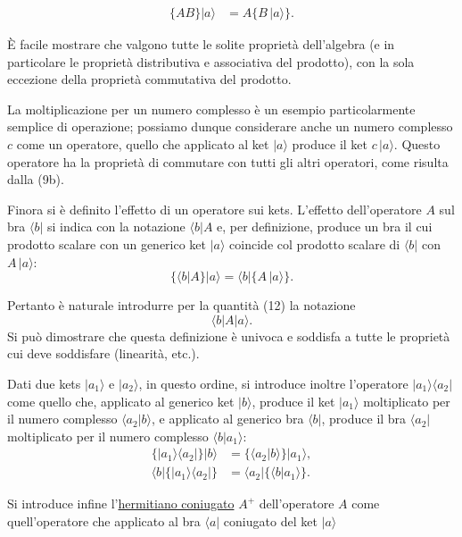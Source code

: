 \documentclass[11pt, a4paper]{book}
\numberwithin{equation}{section}
\begin{document}

\begin{align}
\bigl\{AB\bigr\}|a\rangle &= A\bigl\{B\,|a\rangle\bigr\}. \tag{11}
\end{align}

È facile mostrare che valgono tutte le solite proprietà dell'algebra (e
in particolare le proprietà distributiva e associativa del prodotto), con
la sola eccezione della proprietà commutativa del prodotto.

La moltiplicazione per un numero complesso è un esempio particolarmente
semplice di operazione; possiamo dunque considerare anche un numero
complesso $c$ come un operatore, quello che applicato al ket $|a\rangle$
produce il ket $c\,|a\rangle$. Questo operatore ha la proprietà di
commutare con tutti gli altri operatori, come risulta dalla (9b).

Finora si è definito l'effetto di un operatore sui kets. L'effetto
dell'operatore $A$ sul bra $\langle b|$ si indica con la notazione
$\langle b|A$ e, per definizione, produce un bra il cui prodotto scalare
con un generico ket $|a\rangle$ coincide col prodotto scalare di
$\langle b|$ con $A\,|a\rangle$:
\begin{equation}
\bigl\{\langle b|A\bigr\}|a\rangle = \langle b|\bigl\{A\,|a\rangle\bigr\}.
\end{equation}

Pertanto è naturale introdurre per la quantità (12) la notazione
\[
\langle b|A|a\rangle.
\]
Si può dimostrare che questa definizione è univoca e soddisfa a tutte le
proprietà cui deve soddisfare (linearità, etc.).

Dati due kets $|a_1\rangle$ e $|a_2\rangle$, in questo ordine, si
introduce inoltre l'operatore $|a_1\rangle\langle a_2|$ come quello che,
applicato al generico ket $|b\rangle$, produce il ket $|a_1\rangle$
moltiplicato per il numero complesso $\langle a_2|b\rangle$, e applicato
al generico bra $\langle b|$, produce il bra $\langle a_2|$ moltiplicato
per il numero complesso $\langle b|a_1\rangle$:
\begin{align}
\bigl\{|a_1\rangle\langle a_2|\bigr\}|b\rangle
  &= \bigl\{\langle a_2|b\rangle\bigr\}|a_1\rangle, \tag{13a} \\
\langle b|\bigl\{|a_1\rangle\langle a_2|\bigr\}
  &= \langle a_2|\bigl\{\langle b|a_1\rangle\bigr\}. \tag{13b}
\end{align}

Si introduce infine l'\underline{hermitiano coniugato} $A^+$ dell'operatore
$A$ come quell'operatore che applicato al bra $\langle a|$ coniugato del
ket $|a\rangle$
\end{document}
